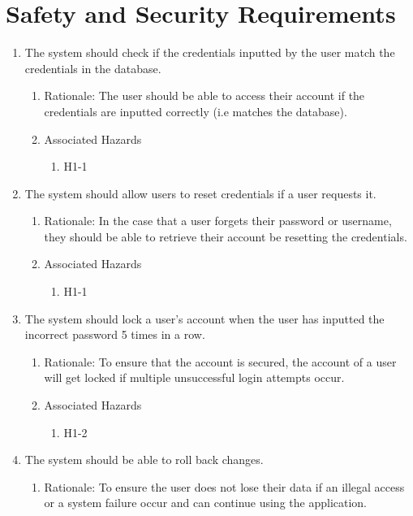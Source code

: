\documentclass{article}
\begin{document}
\section{Safety and Security Requirements}
\begin{enumerate}
	\item The system should check if the credentials inputted by the user match the credentials in the database.
	\begin{enumerate}
		\item Rationale: The user should be able to access their account if the credentials are inputted correctly (i.e matches the database).
		\item Associated Hazards
		\begin{enumerate}
			\item H1-1
		\end{enumerate}
	\end{enumerate}
	\item The system should allow users to reset credentials if a user requests it.
	\begin{enumerate}
		\item Rationale: In the case that a user forgets their password or username, they should be able to retrieve their account be resetting the credentials.
		\item Associated Hazards
		\begin{enumerate}
			\item H1-1
		\end{enumerate}
	\end{enumerate}
	\item The system should lock a user’s account when the user has inputted the incorrect password 5 times in a row.
	\begin{enumerate}
		\item Rationale: To ensure that the account is secured, the account of a user will get locked if multiple unsuccessful login attempts occur. 
		\item Associated Hazards
		\begin{enumerate}
			\item H1-2
		\end{enumerate}
	\end{enumerate} 
	\item The system should be able to roll back changes. 
	\begin{enumerate}
		\item Rationale: To ensure the user does not lose their data if an illegal access or a system failure occur and can continue using the application.

\end{enumerate}
\end{enumerate}
\end{document}
